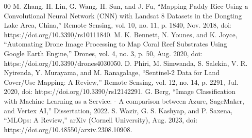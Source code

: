 \documentclass[conference]{IEEEtran}
\begin{document}
\begin{thebibliography}{00}
 M. Zhang, H. Lin, G. Wang, H. Sun, and J. Fu, “Mapping Paddy Rice Using a Convolutional Neural Network (CNN) with Landsat 8 Datasets in the Dongting Lake Area, China,” Remote Sensing, vol. 10, no. 11, p. 1840, Nov. 2018, doi: https://doi.org/10.3390/rs10111840.
 M. K. Bennett, N. Younes, and K. Joyce, “Automating Drone Image Processing to Map Coral Reef Substrates Using Google Earth Engine,” Drones, vol. 4, no. 3, p. 50, Aug. 2020, doi: https://doi.org/10.3390/drones4030050.
 D. Phiri, M. Simwanda, S. Salekin, V. R. Nyirenda, Y. Murayama, and M. Ranagalage, “Sentinel-2 Data for Land Cover/Use Mapping: A Review,” Remote Sensing, vol. 12, no. 14, p. 2291, Jul. 2020, doi: https://doi.org/10.3390/rs12142291.
 G. Berg, “Image Classification with Machine Learning as a Service: - A comparison between Azure, SageMaker, and Vertex AI,” Dissertation, 2022.
 S. Wazir, G. S. Kashyap, and P. Saxena, “MLOps: A Review,” arXiv (Cornell University), Aug. 2023, doi: https://doi.org/10.48550/arxiv.2308.10908.
\end{thebibliography}
\end{document}
